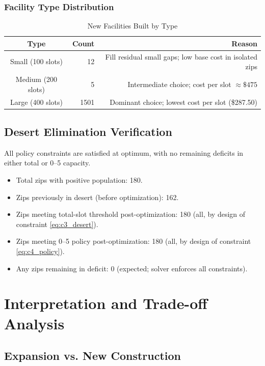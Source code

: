 \documentclass[12pt]{article}
\begin{document}
\subsubsection{Facility Type Distribution}

\begin{table}[h]
\centering
\caption{New Facilities Built by Type}
\begin{tabular}{|c|r|r|}
\hline
\textbf{Type} & \textbf{Count} & \textbf{Reason} \\
\hline
Small (100 slots) & 12 & Fill residual small gaps; low base cost in isolated zips \\
\hline
Medium (200 slots) & 5 & Intermediate choice; cost per slot $\approx \$475$ \\
\hline
Large (400 slots) & 1501 & Dominant choice; lowest cost per slot (\$287.50) \\
\hline
\end{tabular}
\end{table}

\subsection{Desert Elimination Verification}

All policy constraints are satisfied at optimum, with no remaining deficits in either total or 0--5 capacity.

\begin{itemize}
    \item Total zips with positive population: 180.
    \item Zips previously in desert (before optimization): 162.
    \item Zips meeting total-slot threshold post-optimization: 180 (all, by design of constraint \eqref{eq:c3_desert}).
    \item Zips meeting 0--5 policy post-optimization: 180 (all, by design of constraint \eqref{eq:c4_policy}).
    \item Any zips remaining in deficit: 0 (expected; solver enforces all constraints).
\end{itemize}

\section{Interpretation and Trade-off Analysis}

\subsection{Expansion vs. New Construction}
\end{document}
